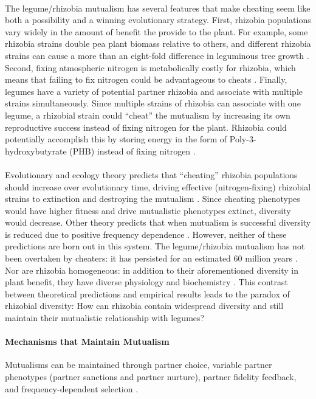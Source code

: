\documentclass[12pt]{article}
\begin{document}
\begin{doublespace}
	\paragraph{}
The legume/rhizobia mutualism has several features that make cheating seem like both a possibility and a winning evolutionary strategy. First, rhizobia populations vary widely in the amount of benefit the provide to the plant. For example, some rhizobia strains double pea plant biomass relative to others, and different rhizobia strains can cause a more than an eight-fold difference in leguminous tree growth \cite{Laguerre2007,Turk1993}. Second, fixing atmospheric nitrogen is metabolically costly for rhizobia, which means that failing to fix nitrogen could be advantageous to cheats \cite{Stam1987}. Finally, legumes have a variety of potential partner rhizobia and associate with multiple strains simultaneously. Since multiple strains of rhizobia can associate with one legume, a rhizobial strain could “cheat” the mutualism by increasing its own reproductive success instead of fixing nitrogen for the plant. Rhizobia could potentially accomplish this by storing energy in the form of Poly-3-hydroxybutyrate (PHB) instead of fixing nitrogen \cite{Ratcliff2008}.
	\paragraph{}
Evolutionary and ecology theory predicts that ``cheating'' rhizobia populations should increase over evolutionary time, driving effective (nitrogen-fixing) rhizobial strains to extinction and destroying the mutualism \cite{West2002}. Since cheating phenotypes would have higher fitness and drive mutualistic phenotypes extinct, diversity would decrease. Other theory predicts that when mutualism is successful diversity is reduced due to positive frequency dependence \cite{Law1985, Doebeli2000,Kopp2006}. However, neither of these predictions are born out in this system. The legume/rhizobia mutualism has not been overtaken by cheaters: it has persisted for an estimated 60 million years \cite{Lavin2005}. Nor are rhizobia homogeneous: in addition to their aforementioned diversity in plant benefit, they have diverse physiology and biochemistry \cite{Zhang1991,Aserse2012}. This contrast between theoretical predictions and empirical results leads to the paradox of rhizobial diversity: How can rhizobia contain widespread diversity and still maintain their mutualistic relationship with legumes? 


\paragraph{Mechanisms that Maintain Mutualism}
 Mutualisms can be maintained through partner choice, variable partner phenotypes (partner sanctions and partner nurture), partner fidelity feedback, and frequency-dependent selection \cite{Simms2002}. 

\end{doublespace}
\end{document}
